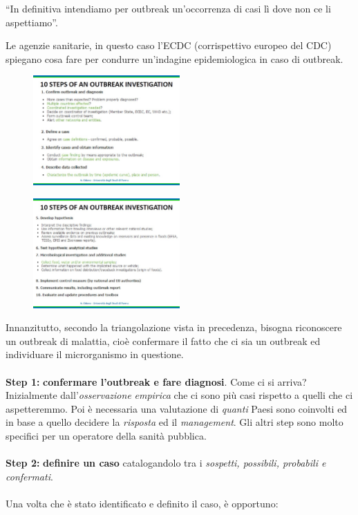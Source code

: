 ``In definitiva intendiamo per outbreak un'occorrenza di casi lì dove
non ce li aspettiamo''.

Le agenzie sanitarie, in questo caso l'ECDC (corrispettivo europeo del
CDC) spiegano cosa fare per condurre un'indagine epidemiologica in caso
di outbreak.

\begin{figure}[!ht]
\centering
	\includegraphics[width=0.5\textwidth]{26/image7.jpeg}
	\end{figure}
	
\begin{figure}[!ht]
\centering
	\includegraphics[width=0.5\textwidth]{26/image8.jpeg}
	\end{figure}

Innanzitutto, secondo la triangolazione vista in precedenza, bisogna
riconoscere un outbreak di malattia, cioè confermare il fatto che ci sia
un outbreak ed individuare il microrganismo in questione.
\\\\
\textbf{Step 1:} \textbf{confermare l'outbreak e fare diagnosi}. Come ci
si arriva? Inizialmente dall'\emph{osservazione} \emph{empirica} che ci
sono più casi rispetto a quelli che ci aspetteremmo. Poi è necessaria
una valutazione di \emph{quanti} Paesi sono coinvolti ed in base a
quello decidere la \emph{risposta} ed il \emph{management}. Gli altri
step sono molto specifici per un operatore della sanità pubblica.
\\\\
\textbf{Step 2:} \textbf{definire un caso} catalogandolo tra i
\emph{sospetti, possibili, probabili e confermati}.
\\\\
Una volta che è stato identificato e definito il caso, è opportuno:

